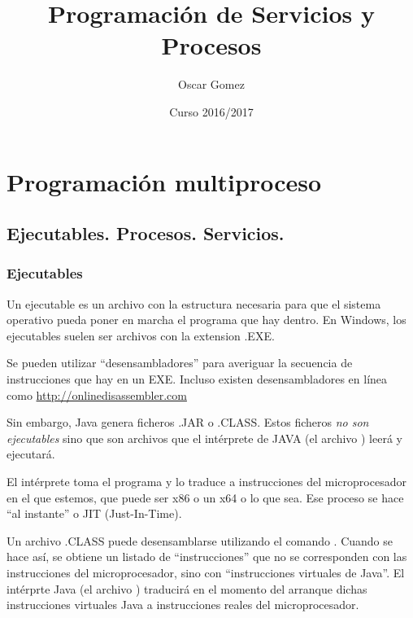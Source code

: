 \documentclass[a4paper,12pt,spanish]{sphinxmanual}
\title{Programación de Servicios y Procesos}
\date{Curso 2016/2017}
\author{Oscar Gomez}
\begin{document}
\maketitle
\tableofcontents
{}\label{index::doc}



\chapter{{}Programación multiproceso}
\label{textos/tema1:programacion-de-servicios-y-procesos}\label{textos/tema1:programacion-multiproceso}\label{textos/tema1::doc}

\section{Ejecutables. Procesos. Servicios.}
\label{textos/tema1:ejecutables-procesos-servicios}

\subsection{Ejecutables}
\label{textos/tema1:ejecutables}
Un ejecutable es un archivo con la estructura necesaria para que el sistema operativo pueda poner en marcha el programa que hay dentro. En Windows, los ejecutables suelen ser archivos con la extension .EXE.

Se pueden utilizar ``desensambladores'' para averiguar la secuencia de instrucciones que hay en un EXE. Incluso existen desensambladores en línea como \url{http://onlinedisassembler.com}

Sin embargo, Java genera ficheros .JAR o .CLASS. Estos ficheros \emph{no son ejecutables} sino que son archivos que el intérprete de JAVA (el archivo ) leerá y ejecutará.

El intérprete toma el programa y lo traduce a instrucciones del microprocesador en el que estemos, que puede ser x86 o un x64 o lo que sea. Ese proceso se hace ``al instante'' o JIT (Just-In-Time).

Un archivo .CLASS puede desensamblarse utilizando el comando  . Cuando se hace así, se obtiene un listado de ``instrucciones'' que no se corresponden con las instrucciones del microprocesador, sino con ``instrucciones virtuales de Java''. El intérprte Java (el archivo ) traducirá en el momento del arranque dichas instrucciones virtuales Java a instrucciones reales del microprocesador.
\end{document}
